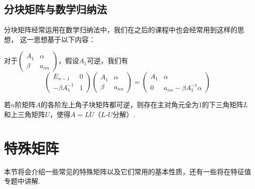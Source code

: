 \subsection{分块矩阵与数学归纳法}
分块矩阵经常运用在数学归纳法中，我们在之后的课程中也会经常用到这样的思想，
这一思想基于以下内容：

对于$\begin{pmatrix}
    A_1 & \alpha \\ \beta & a_{nn}
\end{pmatrix}$，假设$A_1$可逆，我们有
\[\begin{pmatrix}
    E_{n-1} & 0 \\ -\beta A_1^{-1} & 1
\end{pmatrix}\begin{pmatrix}
    A_1 & \alpha \\ \beta & a_{nn}
\end{pmatrix}=\begin{pmatrix}
    A_1 & \alpha \\ 0 & a_{nn}-\beta A_1^{-1}\alpha
\end{pmatrix}\]

\begin{example}
    若$n$阶矩阵$A$的各阶左上角子块矩阵都可逆，则存在主对角元全为1的下三角矩阵$L$和上三角矩阵$U$，使得$A=LU$（$L$-$U$分解）.
\end{example}

\section{特殊矩阵}
本节将会介绍一些常见的特殊矩阵以及它们常用的基本性质，还有一些将在特征值专题中讲解.
